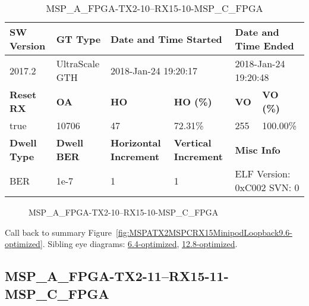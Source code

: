 \begin{table}[h]
\centering
\caption{MSP\_A\_FPGA-TX2-10--RX15-10-MSP\_C\_FPGA}
\label{tab:MSPAFPGATX210RX1510MSPCFPGA9.6-optimized}
\begin{tabular}{@{}|l|l|l|l|l|l|@{}}
\toprule
\textbf{SW Version}                & \textbf{GT Type}   & \multicolumn{2}{l|}{\textbf{Date and Time Started}}            & \multicolumn{2}{l|}{\textbf{Date and Time Ended}}        \\ \midrule
2017.2                       & UltraScale GTH          & \multicolumn{2}{l|}{2018-Jan-24 19:20:17}                   & \multicolumn{2}{l|}{2018-Jan-24 19:20:48}               \\ \midrule
\textbf{Reset RX}                  & \textbf{OA} & \textbf{HO}   & \textbf{HO (\%)} & \textbf{VO} & \textbf{VO (\%)} \\ \midrule
true & 10706        & 47          & 72.31\%        & 255        & 100.00\%       \\ \midrule
\textbf{Dwell Type}                & \textbf{Dwell BER} & \textbf{Horizontal Increment} & \textbf{Vertical Increment}    & \multicolumn{2}{l|}{\textbf{Misc Info}}                  \\ \midrule
BER                            & 1e-7        & 1        & 1           & \multicolumn{2}{l|}{ELF Version: 0xC002 SVN: 0}                         \\ \bottomrule
\end{tabular}
\end{table}

\begin{figure}[h]
\caption{MSP\_A\_FPGA-TX2-10--RX15-10-MSP\_C\_FPGA} \label{fig:MSPAFPGATX210RX1510MSPCFPGA9.6-optimized}
\end{figure}

Call back to summary Figure~\ref{fig:MSPATX2MSPCRX15MinipodLoopback9.6-optimized}.
Sibling eye diagrams: \hyperref[sec:MSPAFPGATX210RX1510MSPCFPGA6.4-optimized]{6.4-optimized}, \hyperref[sec:MSPAFPGATX210RX1510MSPCFPGA12.8-optimized]{12.8-optimized}.

\clearpage
\newpage


\subsection{MSP\_A\_FPGA-TX2-11--RX15-11-MSP\_C\_FPGA}\label{sec:MSPAFPGATX211RX1511MSPCFPGA9.6-optimized}

